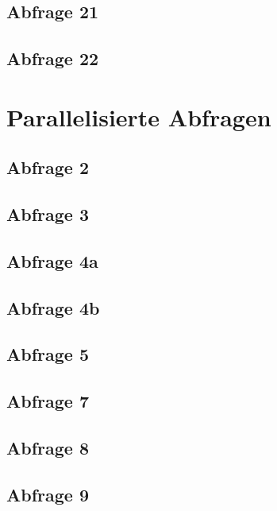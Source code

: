 \subsection*{Abfrage 21}

\subsection*{Abfrage 22}


\section{Parallelisierte Abfragen}
\subsection*{Abfrage 2}

\subsection*{Abfrage 3}

\subsection*{Abfrage 4a}

\subsection*{Abfrage 4b}

\subsection*{Abfrage 5}

\subsection*{Abfrage 7}

\newpage
\subsection*{Abfrage 8}

\subsection*{Abfrage 9}


